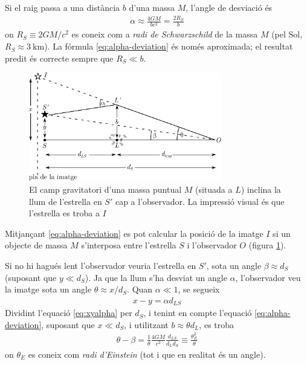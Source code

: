 Si el raig passa a una distància $b$ d'una massa $M$, l'angle de desviació és
\begin{align}\label{eq:alpha-deviation}
	\alpha \approx \frac{4GM}{bc^2} = \frac{2 R_{S}}{b}
\end{align}
on $R_{S} \equiv 2GM/c^2$ es coneix com a \textit{radi de Schwarzschild} de la massa $M$ (pel Sol, $R_{S} \approx \SI{3}{\km}$). La fórmula \eqref{eq:alpha-deviation} és només aproximada; el resultat predit és correcte sempre que $R_{S} \ll b$.
\begin{figure}[H]
	\centering
	\includegraphics[width=0.75\textwidth]{./images/6-image-gravit}
	\caption{El camp gravitatori d'una massa puntual $M$ (situada a $L$) inclina la llum de l'estrella en $S'$ cap a l'observador. La impressió visual és que l'estrella es troba a $I$}
	\label{fig:image-gravit}
\end{figure}

Mitjançant \eqref{eq:alpha-deviation} es pot calcular la posició de la imatge $I$ si un objecte de massa $M$ s'interposa entre l'estrella $S$ i l'observador $O$ (figura \ref{fig:image-gravit}).

Si no hi hagués lent l'observador veuria l'estrella en $S'$, sota un angle $\beta \approx d_{S}$ (suposant que $y \ll d_{S}$). Ja que la llum s'ha desviat un angle $\alpha$, l'observador veu la imatge sota un angle $\theta \approx x/d_{S}$. Quan $\alpha \ll 1$, se segueix
\begin{align}\label{eq:xyalpha}
	x - y = \alpha d_{LS}
\end{align}
Dividint l'equació \eqref{eq:xyalpha} per $d_{S}$, i tenint en compte l'equació \eqref{eq:alpha-deviation}, suposant que $x \ll d_{S}$, i utilitzant $b \approx \theta d_{L}$, es troba
\begin{align}\label{eq:theta-beta}
	\theta - \beta = \frac{1}{\theta} \frac{4GM}{c^{2}} \frac{d_{LS}}{d_{L} d_{S}} \equiv \frac{\theta_{E}^{2}}{\theta}
\end{align}
on $\theta_{E}$ es coneix com \textit{radi d'Einstein} (tot i que en realitat és un angle).

